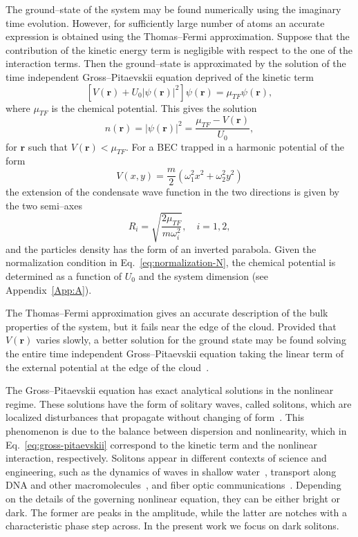 The ground--state of the system may be found numerically using the imaginary time evolution. However, for sufficiently large number of atoms an accurate expression is obtained using the Thomas--Fermi approximation. Suppose that the contribution of the kinetic energy term is negligible with respect to the one of the interaction terms. Then the ground--state is approximated by the solution of the time independent Gross--Pitaevskii equation deprived of the kinetic term
\begin{equation}
\left[ V(\textbf{r}) + U_0 |\psi(\textbf{r})|^2 \right] \psi(\textbf{r}) = \mu_{TF} \psi(\textbf{r}),
\end{equation}
where $\mu_{TF}$ is the chemical potential. This gives the solution
\begin{equation}
n(\textbf{r}) = |\psi(\textbf{r})|^2 = \frac{\mu_{TF} - V(\textbf{r})}{U_0},
\end{equation}
for $\textbf{r}$ such that $V(\textbf{r}) < \mu_{TF}$. 
For a BEC trapped in a harmonic potential of the form
\begin{equation}
V(x,y) = \frac{m}{2} (\omega_1^2 x^2 + \omega_2^2 y^2)
\end{equation}
the extension of the condensate wave function in the two directions is given by the two semi--axes
\begin{equation} \label{eq:TF-radius}
R_i = \sqrt{\frac{2\mu_{TF}}{m\omega_i^2}}, \quad i = 1,2 ,
\end{equation}
and the particles density has the form of an inverted parabola. Given the normalization condition in Eq.~\eqref{eq:normalization-N}, the chemical potential is determined as a function of $U_0$ and the system dimension (see Appendix~\ref{App:A}).

The Thomas--Fermi approximation gives an accurate description of the bulk properties of the system, but it fails near the edge of the cloud. Provided that $V(\textbf{r})$ varies slowly, a better solution for the ground state may be found solving the entire time independent Gross--Pitaevskii equation taking the linear term of the external potential at the edge of the cloud~\citep{pethick2002bose}.

The Gross--Pitaevskii equation has exact analytical solutions in the nonlinear regime. These solutions have the form of solitary waves, called solitons, which are localized disturbances that propagate without changing of form~\citep{RC97,JKP98,DCLZ98,ZPMW99}. This phenomenon is due to the balance between dispersion and nonlinearity, which in Eq.~\eqref{eq:gross-pitaevskii} correspond to the kinetic term and the nonlinear interaction, respectively. Solitons appear in different contexts of science and engineering, such as the dynamics of waves in shallow water~\citep{B88}, transport along DNA and other macromolecules~\citep{P95}, and fiber optic communications~\citep{H90}.
Depending on the details of the governing nonlinear equation, they can be either bright or dark. The former are peaks in the amplitude, while the latter are notches with a characteristic phase step across. In the present work we focus on dark solitons. 

